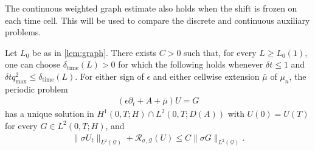 \documentclass[print,wide,eng]{draft}
\begin{document}
The continuous weighted graph estimate also holds when the shift is frozen on each time cell. This will be used to compare the discrete and continuous auxiliary problems.
%
\begin{lemma}\label{lem:frozen}
Let $L_0$ be as in \cref{lem:graph}.
There exists $C>0$ such that, for every $L\geq L_0(1)$, one can choose $\delta_{\mathrm{time}}(L)>0$ for which the following holds whenever ${\delta t}\leq1$ and ${\delta t}q_{\max}^2\leq\delta_{\mathrm{time}}(L)$. For either sign of $\epsilon$ and either cellwise extension $\bar\mu$ of $\mu_n$, the periodic problem
%
\begin{align}\label{eq:frozencontinuous}
(\epsilon\partial_t+A+\bar\mu)U=G
\end{align}
%
has a unique solution in $H^1(0,T;H)\cap L^2(0,T;D(A))$ with $U(0)=U(T)$ for every $G\in L^2(0,T;H)$, and
%
\begin{align}\label{eq:frozengraph}
\|\sigma U_t\|_{L^2(\mathcal Q)}+\mathcal{R}_{\sigma,\mathcal Q}(U)\le C\|\sigma G\|_{L^2(\mathcal Q)}.
\end{align}
%
\end{lemma}
%
\end{document}
